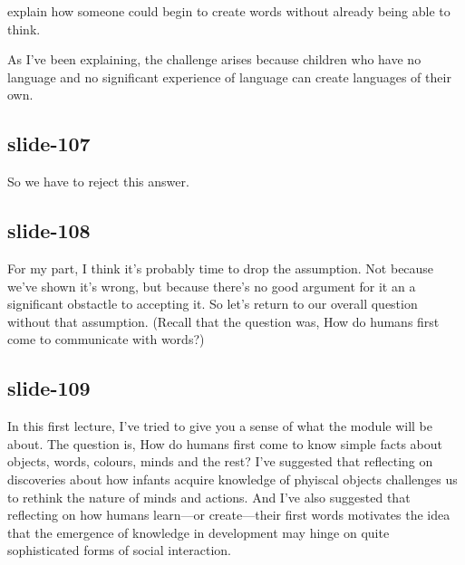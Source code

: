 \documentclass[12pt,\papersize]{extarticle}
\begin{document}
explain how someone could begin to create words without already being able to think.

As I've been explaining, the challenge arises because children who have no language and no significant experience of language can create languages of their own.

\subsection{slide-107}
So we have to reject this answer.

\subsection{slide-108}
For my part, I think it's probably time to drop the assumption.
Not because we've shown it's wrong, but because there's no good argument for it an a
significant obstactle to accepting it.
So let's return to our overall question without that assumption.
(Recall that the question was, How do humans first come to communicate with words?)

\subsection{slide-109}
In this first lecture, I’ve tried to give you a sense of what the module
will be about.
The question is, How do humans first come to know simple facts about objects,
words, colours, minds and the rest?
I’ve suggested that
reflecting on discoveries about how infants acquire knowledge of phyiscal objects
challenges us to rethink the nature of minds and actions.
And I’ve also suggested that reflecting on how humans learn---or create---their
first words motivates the idea that the emergence of knowledge in development
may hinge on  quite sophisticated forms of social interaction.









\end{document}
